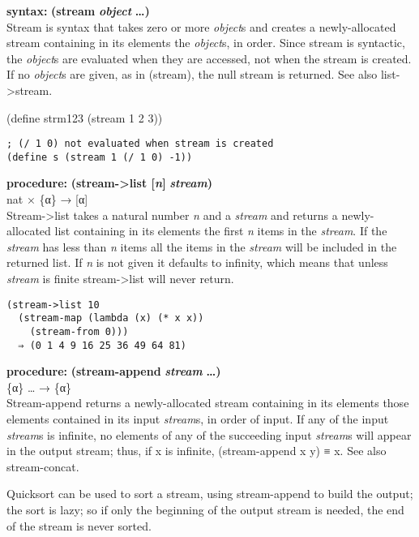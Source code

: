 \textbf{syntax:} \textbf{(stream} \textbf{\emph{object}}
\textbf{\ldots{})}\\
Stream is syntax that takes zero or more \emph{object}s and creates a
newly-allocated stream containing in its elements the \emph{object}s, in
order. Since stream is syntactic, the \emph{object}s are evaluated when
they are accessed, not when the stream is created. If no \emph{object}s
are given, as in (stream), the null stream is returned. See also
list-\textgreater{}stream.

(define strm123 (stream 1 2 3))

\begin{verbatim}
; (/ 1 0) not evaluated when stream is created
(define s (stream 1 (/ 1 0) -1))
\end{verbatim}

\textbf{procedure:} \textbf{(stream-\textgreater{}list {[}\emph{n}{]}}
\textbf{\emph{stream})}\\
nat × \{α\} → {[}α{]}\\
Stream-\textgreater{}list takes a natural number \emph{n} and a
\emph{stream} and returns a newly-allocated list containing in its
elements the first \emph{n} items in the \emph{stream}. If the
\emph{stream} has less than \emph{n} items all the items in the
\emph{stream} will be included in the returned list. If \emph{n} is not
given it defaults to infinity, which means that unless \emph{stream} is
finite stream-\textgreater{}list will never return.

\begin{verbatim}
(stream->list 10
  (stream-map (lambda (x) (* x x))
    (stream-from 0)))
  ⇒ (0 1 4 9 16 25 36 49 64 81)
\end{verbatim}

\textbf{procedure:} \textbf{(stream-append} \textbf{\emph{stream}}
\textbf{\ldots{})}\\
\{α\} \ldots{} → \{α\}\\
Stream-append returns a newly-allocated stream containing in its
elements those elements contained in its input \emph{stream}s, in order
of input. If any of the input \emph{stream}s is infinite, no elements of
any of the succeeding input \emph{stream}s will appear in the output
stream; thus, if x is infinite, (stream-append x y) ≡ x. See also
stream-concat.

Quicksort can be used to sort a stream, using stream-append to build the
output; the sort is lazy; so if only the beginning of the output stream
is needed, the end of the stream is never sorted.

